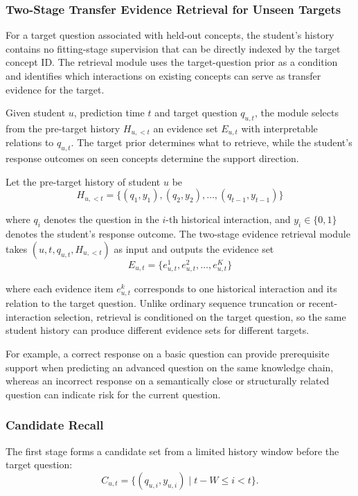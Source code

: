 \documentclass[a4paper,12pt]{article}
\numberwithin{table}{section}
\begin{document}
\subsubsection{Two-Stage Transfer Evidence Retrieval for Unseen Targets}

For a target question associated with held-out concepts, the student's history contains no fitting-stage supervision that can be directly indexed by the target concept ID. The retrieval module uses the target-question prior as a condition and identifies which interactions on existing concepts can serve as transfer evidence for the target.

Given student \(u\), prediction time \(t\) and target question \(q_{u,t}\), the module selects from the pre-target history \(H_{u,<t}\) an evidence set \(E_{u,t}\) with interpretable relations to \(q_{u,t}\). The target prior determines what to retrieve, while the student's response outcomes on seen concepts determine the support direction.

Let the pre-target history of student \(u\) be
\[
H_{u,<t}=\{(q_1,y_1),(q_2,y_2),\ldots,(q_{t-1},y_{t-1})\}
\]

where \(q_i\) denotes the question in the \(i\)-th historical interaction, and \(y_i\in\{0,1\}\) denotes the student's response outcome. The two-stage evidence retrieval module takes \((u,t,q_{u,t},H_{u,<t})\) as input and outputs the evidence set
\[
E_{u,t}=\{e_{u,t}^{1},e_{u,t}^{2},\ldots,e_{u,t}^{K}\}
\]

where each evidence item \(e_{u,t}^{k}\) corresponds to one historical interaction and its relation to the target question. Unlike ordinary sequence truncation or recent-interaction selection, retrieval is conditioned on the target question, so the same student history can produce different evidence sets for different targets.

For example, a correct response on a basic question can provide prerequisite support when predicting an advanced question on the same knowledge chain, whereas an incorrect response on a semantically close or structurally related question can indicate risk for the current question.

\subsubsection{Candidate Recall}

The first stage forms a candidate set from a limited history window before the target question:
\[
C_{u,t}=\{(q_{u,i},y_{u,i})\mid t-W\leq i<t\}.
\]
\end{document}
